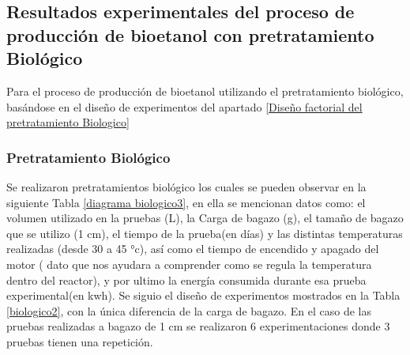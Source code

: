 \documentclass[12pt]{article}
\begin{document}
	
	
	
	
	
	
	
	
			
			\subsection{Resultados experimentales del proceso de producción de bioetanol con pretratamiento Biológico}
			Para el proceso de producción de bioetanol utilizando el pretratamiento biológico, basándose en el diseño de experimentos del apartado \ref{Diseño factorial del pretratamiento Biologico}
			
					\subsubsection{Pretratamiento Biológico}
	Se realizaron pretratamientos biológico los cuales se pueden observar en la siguiente Tabla \ref{diagrama biologico3}, en ella se mencionan datos como: el volumen utilizado en la pruebas (L), la Carga de bagazo (g), el tamaño de bagazo que se utilizo (1 cm), el tiempo de la prueba(en días) y las distintas temperaturas realizadas (desde 30 a 45 °c), así como el tiempo de encendido y apagado del motor ( dato que nos ayudara a comprender como se regula la temperatura dentro del reactor), y por ultimo la energía consumida durante esa prueba experimental(en kwh). Se siguio el diseño de experimentos mostrados en la Tabla \ref{biologico2}, con la única diferencia de la carga de bagazo. En el caso de las pruebas realizadas a bagazo de 1 cm se realizaron 6 experimentaciones donde 3 pruebas tienen una repetición.
	
\end{document}
